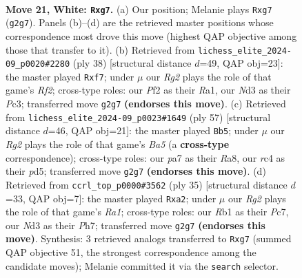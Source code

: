 \documentclass[11pt]{article}
\begin{document}
\clearpage

\begin{figure}[p]\centering
\begin{subfigure}{0.46\textwidth}\centering
\resizebox{\linewidth}{!}{%
\newchessgame
\chessboard[
  setfen={2kr4/ppp2ppp/4p3/8/2r5/3N4/PP1K1PRP/1R6 w - - 0 21},
  showmover=false,
  pgfstyle=straightmove, color=movearrow, markmove={g2-g7}
]}
\caption{}
\end{subfigure}\hfill
\begin{subfigure}{0.46\textwidth}\centering
\resizebox{\linewidth}{!}{%
\newchessgame
\chessboard[
  setfen={2kr4/ppp2ppp/8/8/8/2P1r3/PPK2RPP/R7 w - - 0 20},
  showmover=false,
  pgfstyle=straightmove, color=movearrow, markmove={f2-f7}
]}
\caption{}
\end{subfigure}
\\[4pt]
\begin{subfigure}{0.46\textwidth}\centering
\resizebox{\linewidth}{!}{%
\newchessgame
\chessboard[
  setfen={r7/1R1nk3/p4pp1/2pP4/b1N5/6P1/4PP1P/R5K1 b - - 5 29},
  showmover=false,
  pgfstyle=straightmove, color=movearrow, markmove={a4-b5}
]}
\caption{}
\end{subfigure}\hfill
\begin{subfigure}{0.46\textwidth}\centering
\resizebox{\linewidth}{!}{%
\newchessgame
\chessboard[
  setfen={r5k1/1pp4p/1p2rp2/8/3R4/5P2/PPP3PP/2K4R b - - 0 18},
  showmover=false,
  pgfstyle=straightmove, color=movearrow, markmove={a8-a2}
]}
\caption{}
\end{subfigure}
\caption{\textbf{Move 21, White: \texttt{Rxg7}.} (a) Our position; Melanie plays \texttt{Rxg7} (\texttt{g2g7}). Panels (b)--(d) are the retrieved master positions whose correspondence most drove this move (highest QAP objective among those that transfer to it). (b) Retrieved from \texttt{lichess\_elite\_2024-09\_p0020\#2280} (ply 38) [structural distance $d$=49, QAP obj=23]: the master played \texttt{Rxf7}; under $\mu$ our \emph{Rg2} plays the role of that game's \emph{Rf2}; cross-type roles: our \emph{P}f2 as their \emph{R}a1, our \emph{N}d3 as their \emph{P}c3; transferred move \texttt{g2g7} \textbf{(endorses this move)}. (c) Retrieved from \texttt{lichess\_elite\_2024-09\_p0023\#1649} (ply 57) [structural distance $d$=46, QAP obj=21]: the master played \texttt{Bb5}; under $\mu$ our \emph{Rg2} plays the role of that game's \emph{Ba5} (a \textbf{cross-type} correspondence); cross-type roles: our \emph{p}a7 as their \emph{R}a8, our \emph{r}c4 as their \emph{p}d5; transferred move \texttt{g2g7} \textbf{(endorses this move)}. (d) Retrieved from \texttt{ccrl\_top\_p0000\#3562} (ply 35) [structural distance $d$=33, QAP obj=7]: the master played \texttt{Rxa2}; under $\mu$ our \emph{Rg2} plays the role of that game's \emph{Ra1}; cross-type roles: our \emph{R}b1 as their \emph{P}c7, our \emph{N}d3 as their \emph{P}h7; transferred move \texttt{g2g7} \textbf{(endorses this move)}. Synthesis: 3 retrieved analogs transferred to \texttt{Rxg7} (summed QAP objective 51, the strongest correspondence among the candidate moves); Melanie committed it via the \texttt{search} selector.}
\label{fig:thought-m40}
\end{figure}
\end{document}

